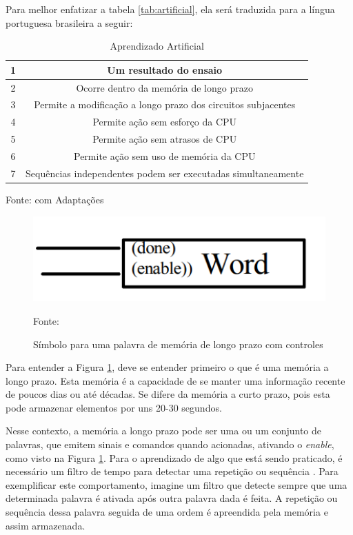Para melhor enfatizar a tabela \ref{tab:artificial}, ela será traduzida para a língua portuguesa brasileira a seguir:

\begin{table}[H]
\centering
\begin{tabular}{|c|c|}
\hline
1 & Um resultado do ensaio                    \\ \hline
2 & Ocorre dentro da memória de longo prazo \\ \hline
3 & Permite a modificação a longo prazo dos circuitos subjacentes \\ \hline
4 & Permite ação sem esforço da CPU \\ \hline
5 & Permite ação sem atrasos de CPU \\ \hline
6 & Permite ação sem uso de memória da CPU \\ \hline
7 & Sequências independentes podem ser executadas simultaneamente \\ \hline
\end{tabular}
\caption{Aprendizado Artificial}
Fonte: \cite{john} com Adaptações
\label{tab:artificialtraduzido}
\end{table}

\begin{figure}[H]
		\centering
		\includegraphics[width=14.5cm]{figuras/sinaisdememoria}
        \caption{Símbolo para uma palavra de memória de longo prazo com controles}
        Fonte: \cite{john}
		\label{img:palavra}
\end{figure}

Para entender a Figura \ref{img:palavra}, deve se entender primeiro o que é uma memória a longo prazo. Esta memória é a capacidade de se manter uma informação recente de poucos dias ou até décadas. Se difere da memória a curto prazo, pois esta pode armazenar elementos por uns 20-30 segundos.

Nesse contexto, a memória a longo prazo pode ser uma ou um conjunto de palavras, que emitem sinais e comandos quando acionadas, ativando o \textit{enable}, como visto na Figura \ref{img:palavra}. Para o aprendizado de algo que está sendo praticado, é necessário um filtro de tempo para detectar uma repetição ou sequência \cite{john}. Para exemplificar este comportamento, imagine um filtro que detecte sempre que uma determinada palavra é ativada após outra palavra dada é feita. A repetição ou sequência dessa palavra seguida de uma ordem é apreendida pela memória e assim armazenada.

